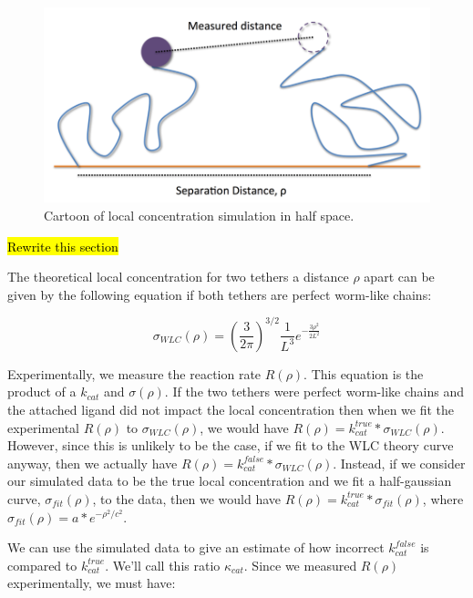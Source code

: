 \documentclass[../../AdvancementSummary.tex]{subfiles}
\begin{document}
\begin{figure}
\includegraphics[width=\linewidth]{Diagram.png}
\caption{Cartoon of local concentration simulation in half space.}
\end{figure}

\hl{Rewrite this section}

The theoretical local concentration for two tethers a distance $\rho$ apart can be given by the following equation if both tethers are perfect worm-like chains:

\begin{equation}
    \sigma_{WLC}(\rho) = \left(\frac{3}{2\pi}\right)^{3/2} \frac{1}{L^3}e^{-\frac{3\rho^2}{2L^2}}
\end{equation}

Experimentally, we measure the reaction rate $R(\rho)$.  This equation is the product of a $k_{cat}$ and $\sigma(\rho)$.  If the two tethers were perfect worm-like chains and the attached ligand did not impact the local concentration then when we fit the experimental $R(\rho)$ to $\sigma_{WLC}(\rho)$, we would have $R(\rho) = k^{true}_{cat}*\sigma_{WLC}(\rho)$. However, since this is unlikely to be the case, if we fit to the WLC theory curve anyway, then we actually have $R(\rho) = k^{false}_{cat}*\sigma_{WLC}(\rho)$. Instead, if we consider our simulated data to be the true local concentration and we fit a half-gaussian curve, $\sigma_{fit}(\rho)$, to the data, then we would have $R(\rho) = k^{true}_{cat}*\sigma_{fit}(\rho)$, where $\sigma_{fit}(\rho) = a*e^{-\rho^2/c^2}$.

We can use the simulated data to give an estimate of how incorrect $k^{false}_{cat}$ is compared to $k^{true}_{cat}$. We'll call this ratio $\kappa_{cat}$. Since we measured $R(\rho)$ experimentally, we must have:

\end{document}
